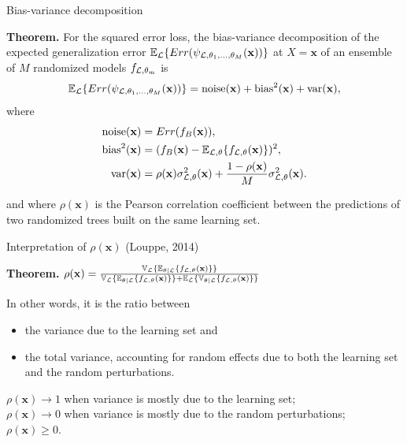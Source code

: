 \documentclass{beamer}
\begin{document}
\begin{frame}{Bias-variance decomposition}

{\bf Theorem.}
For the squared error loss, the bias-variance decomposition of the expected
generalization error $\mathbb{E}_{\cal L} \{ Err( \psi_{{\cal L},\theta_1,\dots,\theta_M}(\mathbf{x}))
\}$ at $X=\mathbf{x}$ of an ensemble of $M$ randomized models $f_{{\cal L},\theta_m}$ is
\begin{equation*}
\mathbb{E}_{\cal L} \{ Err(\psi_{{\cal L},\theta_1,\dots,\theta_M}(\mathbf{x})) \} = \text{noise}(\mathbf{x}) + \text{bias}^2(\mathbf{x}) + \text{var}(\mathbf{x}),
\end{equation*}
where
\begin{align*}
\text{noise}(\mathbf{x}) &= Err(f_B(\mathbf{x})), \\
\text{bias}^2(\mathbf{x}) &= (f_B(\mathbf{x}) - \mathbb{E}_{{\cal L},\theta} \{ f_{{\cal L},\theta}(\mathbf{x}) \} )^2, \\
\text{var}(\mathbf{x}) &= \rho(\mathbf{x}) \sigma^2_{{\cal L},\theta}(\mathbf{x}) + \frac{1 - \rho(\mathbf{x})}{M} \sigma^2_{{\cal L},\theta}(\mathbf{x}).
\end{align*}

and where $\rho(\mathbf{x})$ is the Pearson correlation coefficient between
the predictions of two randomized trees built on the same learning set.

\end{frame}

\begin{frame}{Interpretation of $\rho(\mathbf{x})$ {\scriptsize (Louppe, 2014)}}

{\bf Theorem.} $\rho(\mathbf{x}) = \frac{\mathbb{V}_{\cal L} \{ \mathbb{E}_{\theta|{\cal L}} \{ f_{{\cal L},\theta}(\mathbf{x}) \} \}}{\mathbb{V}_{\cal L} \{ \mathbb{E}_{\theta|{\cal L}} \{ f_{{\cal L},\theta}(\mathbf{x}) \} \} + \mathbb{E}_{\cal L} \{ \mathbb{V}_{\theta|{\cal L}} \{ f_{{\cal L},\theta}(\mathbf{x}) \} \}}$

\vspace{1cm}

In other words, it is the ratio between
\begin{itemize}
\item the variance due to the learning set and
\item the total variance, accounting for random effects due to both the
  learning set and the random perturbations.
\end{itemize}

\bigskip

$\rho(\mathbf{x}) \to 1$ when variance is mostly due to the learning set; \\
$\rho(\mathbf{x}) \to 0$ when variance is mostly due to the random perturbations;\\
$\rho(\mathbf{x}) \geq 0$.


\end{frame}
\end{document}
